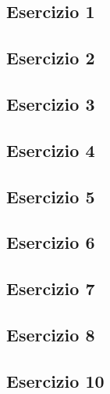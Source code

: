 \vspace{0.8cm}
\subsection{\textbf{Esercizio 1}}

\vspace{1cm}
\subsection{\textbf{Esercizio 2}}

\vspace{1cm}
\subsection{\textbf{Esercizio 3}}

\vspace{1cm}
\subsection{\textbf{Esercizio 4}}

\vspace{1cm}
\subsection{\textbf{Esercizio 5}}

\vspace{1cm}
\subsection{\textbf{Esercizio 6}}

\vspace{1cm}
\subsection{\textbf{Esercizio 7}}

\vspace{1cm}
\subsection{\textbf{Esercizio 8}}

\vspace{1cm}
\subsection{\textbf{Esercizio 10}}

